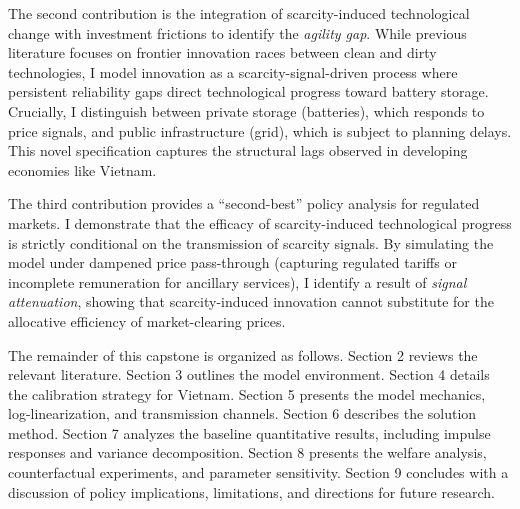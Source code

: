\documentclass[12pt, a4paper]{article}
\begin{document}
The second contribution is the integration of scarcity-induced technological change with investment frictions to identify the \textit{agility gap}. While previous literature focuses on frontier innovation races between clean and dirty technologies, I model innovation as a scarcity-signal-driven process where persistent reliability gaps direct technological progress toward battery storage. Crucially, I distinguish between private storage (batteries), which responds to price signals, and public infrastructure (grid), which is subject to planning delays. This novel specification captures the structural lags observed in developing economies like Vietnam.

The third contribution provides a ``second-best'' policy analysis for regulated markets. I demonstrate that the efficacy of scarcity-induced technological progress is strictly conditional on the transmission of scarcity signals. By simulating the model under dampened price pass-through (capturing regulated tariffs or incomplete remuneration for ancillary services), I identify a result of \textit{signal attenuation}, showing that scarcity-induced innovation cannot substitute for the allocative efficiency of market-clearing prices.

The remainder of this capstone is organized as follows. Section 2 reviews the relevant literature. Section 3 outlines the model environment. Section 4 details the calibration strategy for Vietnam. Section 5 presents the model mechanics, log-linearization, and transmission channels. Section 6 describes the solution method. Section 7 analyzes the baseline quantitative results, including impulse responses and variance decomposition. Section 8 presents the welfare analysis, counterfactual experiments, and parameter sensitivity. Section 9 concludes with a discussion of policy implications, limitations, and directions for future research.
\end{document}
